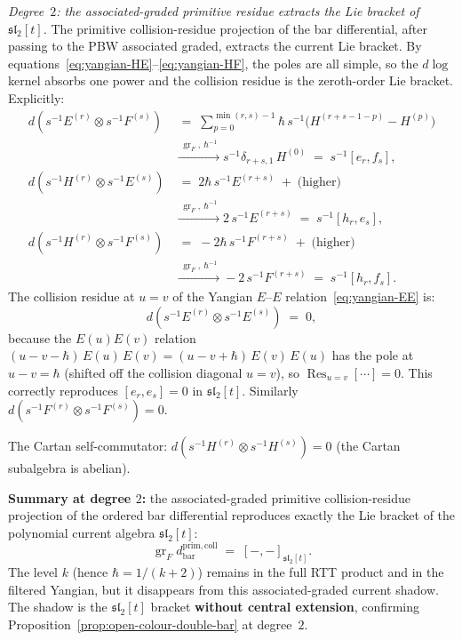 \begin{computation}
\emph{Degree~$2$: the associated-graded primitive residue extracts
the Lie bracket of $\mathfrak{sl}_2[t]$.}\enspace
The primitive collision-residue projection of the bar differential,
after passing to the PBW associated graded, extracts the
current Lie bracket. By
equations~\eqref{eq:yangian-HE}--\eqref{eq:yangian-HF},
the poles are all simple, so the $d\!\log$ kernel
absorbs one power and the collision residue is the
zeroth-order Lie bracket. Explicitly:
\begin{align*}
d(s^{-1}E^{(r)}\otimes s^{-1}F^{(s)})
&\;=\;
\sum_{p=0}^{\min(r,s)-1}
\hbar\,s^{-1}\bigl(
H^{(r+s-1-p)} - H^{(p)}\bigr)
\\
&\xrightarrow{\;\operatorname{gr}_F,\ \hbar^{-1}\;}
s^{-1}\delta_{r+s,1}\,H^{(0)}
\;=\;s^{-1}[e_r,f_s],
\\[4pt]
d(s^{-1}H^{(r)}\otimes s^{-1}E^{(s)})
&\;=\;
2\hbar\,s^{-1}E^{(r+s)}
\;+\;\text{(higher)}
\\
&\xrightarrow{\;\operatorname{gr}_F,\ \hbar^{-1}\;}
2\,s^{-1}E^{(r+s)}
\;=\;s^{-1}[h_r,e_s],
\\[4pt]
d(s^{-1}H^{(r)}\otimes s^{-1}F^{(s)})
&\;=\;
-2\hbar\,s^{-1}F^{(r+s)}
\;+\;\text{(higher)}
\\
&\xrightarrow{\;\operatorname{gr}_F,\ \hbar^{-1}\;}
-2\,s^{-1}F^{(r+s)}
\;=\;s^{-1}[h_r,f_s].
\end{align*}
The collision residue at $u = v$ of the Yangian
$E$--$E$ relation~\eqref{eq:yangian-EE} is:
\[
d(s^{-1}E^{(r)}\otimes s^{-1}E^{(s)})
\;=\;0,
\]
because the $E(u)E(v)$ relation
$(u{-}v{-}\hbar)\,E(u)\,E(v)
= (u{-}v{+}\hbar)\,E(v)\,E(u)$
has the pole at $u{-}v = \hbar$ (shifted off the
collision diagonal $u = v$), so
$\operatorname{Res}_{u=v}[\cdots] = 0$. This
correctly reproduces $[e_r,e_s] = 0$ in
$\mathfrak{sl}_2[t]$. Similarly
$d(s^{-1}F^{(r)}\otimes s^{-1}F^{(s)}) = 0$.

The Cartan self-commutator:
$d(s^{-1}H^{(r)}\otimes s^{-1}H^{(s)}) = 0$
(the Cartan subalgebra is abelian).

\textbf{Summary at degree $2$:} the associated-graded primitive
collision-residue projection of the ordered bar differential
reproduces exactly the Lie bracket of the polynomial current algebra
$\mathfrak{sl}_2[t]$:
\[
\operatorname{gr}_F d_{\mathrm{bar}}^{\mathrm{prim,coll}}
\;=\;
[-,-]_{\mathfrak{sl}_2[t]}.
\]
The level \(k\) (hence \(\hbar = 1/(k{+}2)\)) remains in the full RTT
product and in the filtered Yangian, but it disappears from this
associated-graded current shadow.  The shadow is the
\(\mathfrak{sl}_2[t]\) bracket \textbf{without central extension},
confirming
Proposition~\ref{prop:open-colour-double-bar}
at degree~$2$.


\end{computation}
